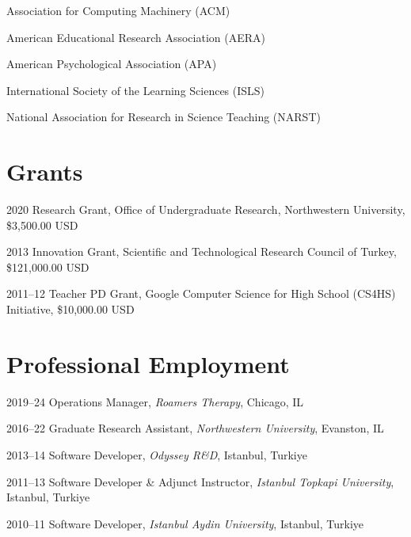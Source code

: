 \documentclass[11pt,letterpaper]{report} %
\newcommand{\listitemspace}{0.25em}
\renewenvironment{itemize}
{\begin{list}{}{\setlength{\leftmargin}{0em}
                \setlength{\parskip}{0em}
                \setlength{\itemsep}{\listitemspace}
                \setlength{\parsep}{\listitemspace}}}
{\end{list}}
\begin{document}
    \begin{itemize}

        \item Association for Computing Machinery (ACM)
        \item American Educational Research Association (AERA)
        \item American Psychological Association (APA)
        \item International Society of the Learning Sciences (ISLS)
        \item National Association for Research in Science Teaching (NARST)

    \end{itemize}


    \section*{Grants}

    \begin{tablist}

        \item[2020] \tab{}Research Grant, Office of Undergraduate Research, Northwestern University, \$3,500.00 USD
        \item[2013] \tab{}Innovation Grant, Scientific and Technological Research Council of Turkey, \$121,000.00 USD
        \item[2011--12] \tab{}Teacher PD Grant, Google Computer Science for High School (CS4HS) Initiative, \$10,000.00 USD

    \end{tablist}



    \section*{Professional Employment}

    \begin{tablist}

        \item[2019--24] \tab{}Operations Manager, \textit{Roamers Therapy}, Chicago, IL
        \item[2016--22] \tab{}Graduate Research Assistant, \textit{Northwestern University}, Evanston, IL
        \item[2013--14] \tab{}Software Developer, \textit{Odyssey R\&D}, Istanbul, Turkiye
        \item[2011--13] \tab{}Software Developer \& Adjunct Instructor, \textit{Istanbul Topkapi University}, Istanbul, Turkiye
        \item[2010--11] \tab{}Software Developer, \textit{Istanbul Aydin University}, Istanbul, Turkiye

    \end{tablist}
\end{document}
